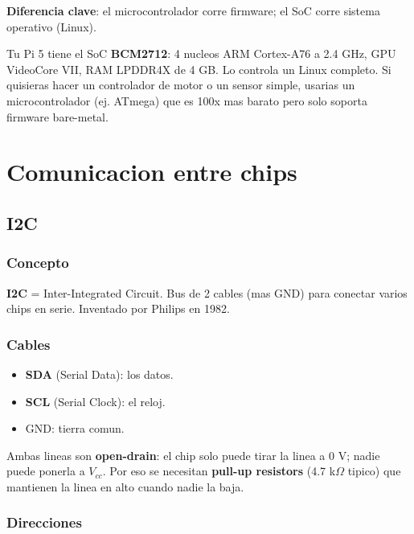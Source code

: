 \documentclass[11pt,a4paper,oneside,openright]{book}
\begin{document}
\textbf{Diferencia clave}: el microcontrolador corre firmware; el SoC corre
sistema operativo (Linux).

\begin{payload}
Tu Pi 5 tiene el SoC \textbf{BCM2712}: 4 nucleos ARM Cortex-A76 a 2.4 GHz,
GPU VideoCore VII, RAM LPDDR4X de 4 GB. Lo controla un Linux completo.
Si quisieras hacer un controlador de motor o un sensor simple, usarias un
microcontrolador (ej. ATmega) que es 100x mas barato pero solo soporta
firmware bare-metal.
\end{payload}

\part{Comunicacion entre chips}

\chapter{I2C}

\section{Concepto}

\textbf{I2C} = Inter-Integrated Circuit. Bus de 2 cables (mas GND) para
conectar varios chips en serie. Inventado por Philips en 1982.

\section{Cables}

\begin{itemize}[leftmargin=2em]
  \item \textbf{SDA} (Serial Data): los datos.
  \item \textbf{SCL} (Serial Clock): el reloj.
  \item GND: tierra comun.
\end{itemize}

Ambas lineas son \textbf{open-drain}: el chip solo puede tirar la linea a
0 V; nadie puede ponerla a $V_{cc}$. Por eso se necesitan \textbf{pull-up
resistors} (4.7 k$\Omega$ tipico) que mantienen la linea en alto cuando
nadie la baja.

\section{Direcciones}
\end{document}
